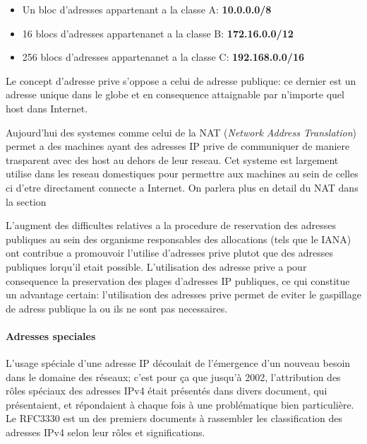 \begin{itemize}
\item Un bloc d'adresses appartenant a la classe A: \textbf{10.0.0.0/8}
\item 16 blocs d'adresses appartenanet a la classe B: \textbf{172.16.0.0/12}
\item 256 blocs d'adresses appartenanet a la classe C: \textbf{192.168.0.0/16}
\end{itemize}

\smallbreak
Le concept d'adresse prive s'oppose a celui de adresse publique: ce dernier est 
un adresse unique dans le globe et en consequence attaignable par n'importe
quel host dans Internet.

Aujourd'hui des systemes comme celui de la NAT ({\it Network Address
Translation}) permet a des machines ayant des adresses IP prive de communiquer
de maniere trasparent avec des host au dehors de leur reseau. Cet systeme est
largement utilise dans les reseau domestiques pour permettre aux machines au
sein de celles ci d'etre directament connecte a Internet. On parlera plus en
detail du NAT dans la section %
\smallbreak


 
L'augment des difficultes relatives a la procedure de reservation des adresses
publiques au sein des organisme responsables des allocations\cite{url-RFC-1918}
(tels que le IANA) ont contribue a promouvoir l'utilise d'adresses prive plutot
que des adresses publiques lorqu'il etait possible.
L'utilisation des adresse prive a pour consequence la preservation des plages
d'adresses IP publiques, ce qui constitue un advantage certain: l'utilisation
des adresses prive permet de eviter le gaspillage de adress publique la ou ils
ne sont pas necessaires.


\paragraph{Adresses speciales}
L'usage spéciale d'une adresse IP découlait de l'émergence
d'un nouveau besoin dans le domaine des réseaux; c'est pour
ça que jusqu'à 2002, l'attribution des rôles spéciaux des adresses
IPv4 était présentés dans divers document, qui présentaient, et répondaient à chaque fois à une
problématique bien particulière. Le RFC3330 est un des premiers documents à
rassembler les classification des adresses IPv4 selon leur rôles et significations.


